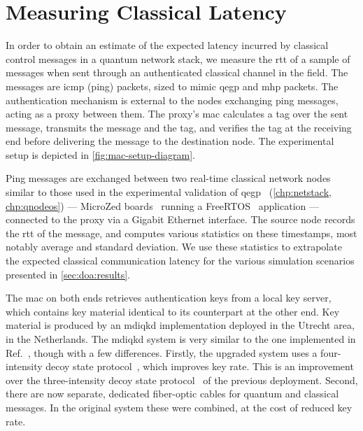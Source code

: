 \section{Measuring Classical Latency}
\label{sec:doa:latency}

In order to obtain an estimate of the expected latency incurred by classical control messages in a
quantum network stack, we measure the \acrfull{rtt} of a sample of messages when sent through an
authenticated classical channel in the field. The messages are \acrshort{icmp} (ping) packets, sized
to mimic \acrshort{qegp} and \acrshort{mhp} packets. The authentication mechanism is external to the
nodes exchanging ping messages, acting as a proxy between them. The proxy's \acrshort{mac}
calculates a tag over the sent message, transmits the message and the tag, and verifies the tag at
the receiving end before delivering the message to the destination node. The experimental setup is
depicted in \cref{fig:mac-setup-diagram}.

Ping messages are exchanged between two real-time classical network nodes similar to those used in
the experimental validation of \acrshort{qegp}~\cite{pompili_2022_experimental}
(\cref{chp:netstack, chp:qnodeos}) --- MicroZed boards~\cite{microzed} running a
FreeRTOS~\cite{freertos} application --- connected to the proxy via a Gigabit Ethernet interface.
The source node records the \acrshort{rtt} of the message, and computes various statistics on these
timestamps, most notably average and standard deviation. We use these statistics to extrapolate the
expected classical communication latency for the various simulation scenarios presented in
\cref{sec:doa:results}.

The \acrfull{mac} on both ends retrieves authentication keys from a local key server, which contains
key material identical to its counterpart at the other end. Key material is produced by an
\acrshort{mdiqkd} implementation deployed in the Utrecht area, in the Netherlands. The
\acrshort{mdiqkd} system is very similar to the one implemented in
Ref.~\cite{berrevoets_2022_deployed}, though with a few differences. Firstly, the upgraded system
uses a four-intensity decoy state protocol~\cite{zhou_2016_making, woodward_2021_gigahertz}, which
improves key rate. This is an improvement over the three-intensity decoy state
protocol~\cite{yu_2013_three} of the previous deployment. Second, there are now separate, dedicated
fiber-optic cables for quantum and classical messages. In the original system these were combined,
at the cost of reduced key rate.

